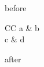 \documentclass{article}
\begin{document}
before
\begin{tabular}{CC} a & b \\ c & d \end{tabular}
after
\end{document}
